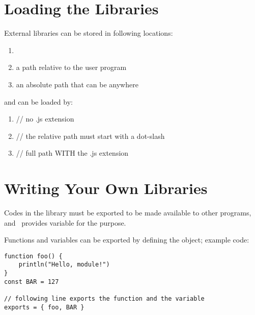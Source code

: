\section{Loading the Libraries}

External libraries can be stored in following locations:

\begin{enumerate}
 \item {}
 \item a path relative to the user program
 \item an absolute path that can be anywhere
\end{enumerate}

and can be loaded by:

\begin{enumerate}
 \item {} // no .js extension
 \item {} // the relative path must start with a dot-slash
 \item {} // full path WITH the .js extension
\end{enumerate}


\section{Writing Your Own Libraries}

Codes in the library must be exported to be made available to other programs, and \thedos\ provides  variable for the purpose.

Functions and variables can be exported by defining the  object; example code:

\begin{lstlisting}
function foo() {
    println("Hello, module!")
}
const BAR = 127

// following line exports the function and the variable
exports = { foo, BAR }
\end{lstlisting}